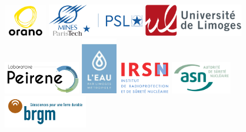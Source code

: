 \documentclass{article}
\begin{document}
\vspace{0.5 em}   
\begin{center}
\includegraphics[height = 40pt]{oranologo.png}
\hspace{0.3em}
\includegraphics[height = 40pt ]{logoMPT.png}
\hspace{0.3em}
\includegraphics[height = 40pt ]{logoUNILIM.png}
\hspace{0.3em}
\includegraphics[height = 40pt ]{Logo-PEIRENE.png}
\vspace{2 cm}
\includegraphics[height = 70pt ]{logoeaulimoges.png}
\hspace{0.3em}
\includegraphics[height = 40pt ]{logoIRSN.png} 
\hspace{0.3em}
\includegraphics[height = 40pt]{logo_ASN.png}
\hspace{0.3em}
\includegraphics[height = 40pt]{logo_BRGM.png}

\end{center}
\end{document}
